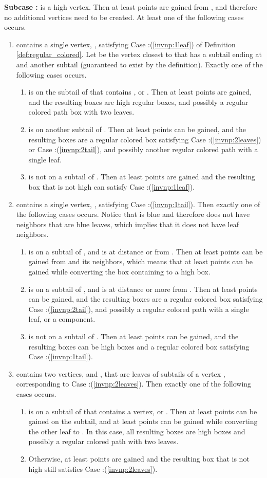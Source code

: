 \documentclass[11pt]{article}
\def\dnsitem{\vspace{-7pt}\item}
\theoremstyle{definition}
\begin{document}
\smallskip
\par\noindent
{\bf Subcase :}
 is a high vertex. Then at least  points are gained from , and therefore no additional  vertices need to be created. At least one of the following cases occurs.
	\begin{enumerate}
		\dnsitem  contains a single  vertex, , satisfying Case :(\ref{invnp:1leaf}) of Definition \ref{def:regular_colored}.
		Let  be the vertex closest to  that has a subtail ending at  and another subtail (guaranteed to exist by the definition).
		Exactly one of the following cases occurs.
		\begin{enumerate}
			\dnsitem  is on the subtail of  that contains , or .
			Then at least  points are gained, 
			and the resulting boxes are high regular boxes, and possibly a regular colored path box with two  leaves.
			\dnsitem  is on another subtail of .
			Then at least  points can be gained, 
			and the resulting boxes are a regular colored box satisfying Case :(\ref{invnp:2leaves}) or Case :(\ref{invnp:2tail}), and possibly another regular colored path with a single  leaf.
			\dnsitem  is not on a subtail of .
			Then at least  points are gained and the resulting box that is not high can satisfy Case :(\ref{invnp:1leaf}).
		\end{enumerate}
		
		\dnsitem  contains a single  vertex, , satisfying Case :(\ref{invnp:1tail}). Then exactly one of the following cases occurs.
		Notice that  is blue and therefore does not have neighbors that are blue leaves, which implies that it does not have leaf neighbors.
		\begin{enumerate}
			\dnsitem  is on a subtail of , and is at distance  or  from . 
			Then at least  points can be gained from  and its neighbors, which means that at least  points can be gained while converting the box containing  to a high box.
			\dnsitem  is on a subtail of , and is at distance  or more from .
			Then at least  points can be gained, and the resulting boxes are a regular colored box satisfying Case :(\ref{invnp:2tail}), and possibly a regular colored path with a single  leaf, or a  component.
			\dnsitem  is not on a subtail of . Then at least  points can be gained, and the resulting boxes can be high boxes and a regular colored box satisfying Case :(\ref{invnp:1tail}).
		\end{enumerate}
		
		\dnsitem  contains two  vertices,  and , that are leaves of subtails of a vertex , corresponding to Case :(\ref{invnp:2leaves}).
		Then exactly one of the following cases occurs.
		\begin{enumerate}
			\dnsitem  is on a subtail of  that contains a  vertex, or . Then at least  points can be gained on the subtail, 
			and at least  points can be gained while converting the other  leaf to .
			In this case, all resulting boxes are high boxes and possibly a regular colored path with two  leaves.
			\dnsitem Otherwise, at least  points are gained and the resulting box that is not high still satisfies Case :(\ref{invnp:2leaves}).
		\end{enumerate}
		

\end{enumerate}
\end{document}
